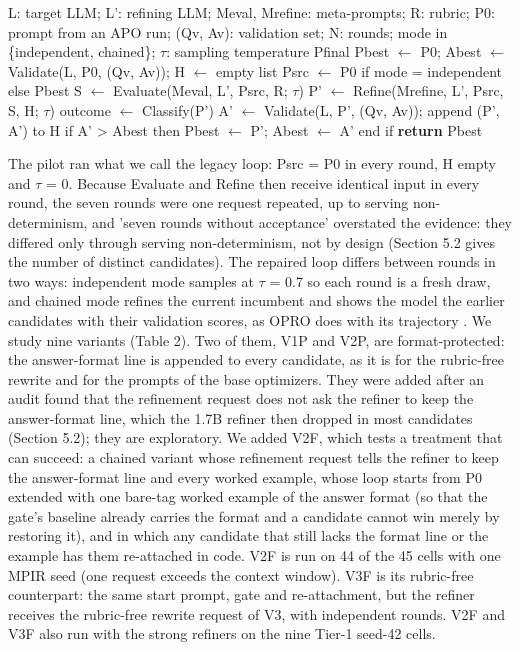 \documentclass{ieeeaccess}
\begin{document}
\begin{algorithm}[htbp]
\caption{MPIR with a validation gate (repaired)}
\begin{algorithmic}[1]
\Require L: target LLM; L': refining LLM; Meval, Mrefine: meta-prompts; R: rubric; P0: prompt from an APO run; (Qv, Av): validation set; N: rounds; mode in \{independent, chained\}; $\tau$: sampling temperature
\Ensure Pfinal
\State Pbest $\leftarrow$ P0; Abest $\leftarrow$ Validate(L, P0, (Qv, Av)); H $\leftarrow$ empty list 
\State Psrc $\leftarrow$ P0 if mode = independent else Pbest
\State S $\leftarrow$ Evaluate(Meval, L', Psrc, R; $\tau$) 
\State P' $\leftarrow$ Refine(Mrefine, L', Psrc, S, H; $\tau$) 
\State outcome $\leftarrow$ Classify(P') 
\State A' $\leftarrow$ Validate(L, P', (Qv, Av)); append (P', A') to H
\State if A' > Abest then Pbest $\leftarrow$ P'; Abest $\leftarrow$ A' end if 
\EndIf
\EndFor
\State \textbf{return} Pbest
\end{algorithmic}
\end{algorithm}

The pilot ran what we call the legacy loop: Psrc = P0 in every round, H empty and $\tau$ = 0. Because Evaluate and Refine then receive identical input in every round, the seven rounds were one request repeated, up to serving non-determinism, and 'seven rounds without acceptance' overstated the evidence: they differed only through serving non-determinism, not by design (Section 5.2 gives the number of distinct candidates). The repaired loop differs between rounds in two ways: independent mode samples at $\tau$ = 0.7 so each round is a fresh draw, and chained mode refines the current incumbent and shows the model the earlier candidates with their validation scores, as OPRO does with its trajectory \cite{yang2024}. We study nine variants (Table 2). Two of them, V1P and V2P, are format-protected: the answer-format line is appended to every candidate, as it is for the rubric-free rewrite and for the prompts of the base optimizers. They were added after an audit found that the refinement request does not ask the refiner to keep the answer-format line, which the 1.7B refiner then dropped in most candidates (Section 5.2); they are exploratory. We added V2F, which tests a treatment that can succeed: a chained variant whose refinement request tells the refiner to keep the answer-format line and every worked example, whose loop starts from P0 extended with one bare-tag worked example of the answer format (so that the gate's baseline already carries the format and a candidate cannot win merely by restoring it), and in which any candidate that still lacks the format line or the example has them re-attached in code. V2F is run on 44 of the 45 cells with one MPIR seed (one request exceeds the context window). V3F is its rubric-free counterpart: the same start prompt, gate and re-attachment, but the refiner receives the rubric-free rewrite request of V3, with independent rounds. V2F and V3F also run with the strong refiners on the nine Tier-1 seed-42 cells.
\end{document}
